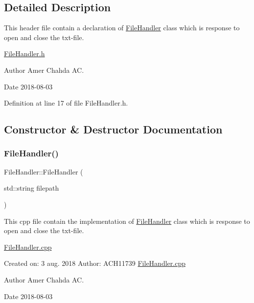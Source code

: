 \subsection{Detailed Description}
This header file contain a declaration of \mbox{\hyperlink{class_file_handler}{File\+Handler}} class which is response to open and close the txt-\/file. 

\mbox{\hyperlink{_file_handler_8h}{File\+Handler.\+h}} \begin{DoxyAuthor}{Author}
Amer Chahda AC. 
\end{DoxyAuthor}
\begin{DoxyDate}{Date}
2018-\/08-\/03 
\end{DoxyDate}


Definition at line 17 of file File\+Handler.\+h.



\subsection{Constructor \& Destructor Documentation}
\mbox{\label{class_file_handler_ab6dc27856e7eef893879d381d62dbc32}} 
\subsubsection{\texorpdfstring{File\+Handler()}{FileHandler()}\hspace{0.1cm}{\footnotesize\ttfamily [1/2]}}
{\footnotesize\ttfamily File\+Handler\+::\+File\+Handler (\begin{DoxyParamCaption}\item[{std\+::string}]{filepath }\end{DoxyParamCaption})}



This cpp file contain the implementation of \mbox{\hyperlink{class_file_handler}{File\+Handler}} class which is response to open and close the txt-\/file. 

\mbox{\hyperlink{_file_handler_8cpp}{File\+Handler.\+cpp}}

Created on\+: 3 aug. 2018 Author\+: A\+C\+H11739 \mbox{\hyperlink{_file_handler_8cpp}{File\+Handler.\+cpp}} \begin{DoxyAuthor}{Author}
Amer Chahda AC. 
\end{DoxyAuthor}
\begin{DoxyDate}{Date}
2018-\/08-\/03 
\end{DoxyDate}


